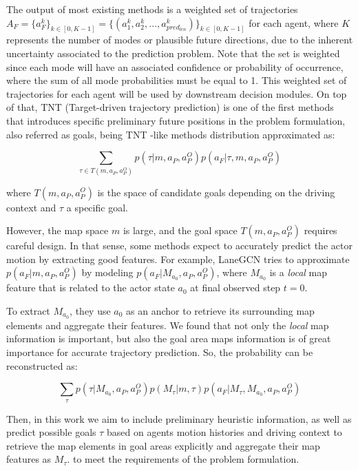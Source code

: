 The output of most existing methods is a weighted set of trajectories $A_F = \{a_{F}^k\}_{k \in [0,K-1]}= \{(a_{1}^k,a_{2}^k,...,a_{pred_{len}}^k)\}_{k \in [0,K-1]}$ for each agent, where $K$ represents the number of modes or plausible future directions, due to the inherent uncertainty associated to the prediction problem. Note that the set is weighted since each mode will have an associated confidence or probability of occurrence, where the sum of all mode probabilities must be equal to 1. This weighted set of trajectories for each agent will be used by downstream decision modules. On top of that, TNT (Target-driven trajectory prediction) \cite{zhao2021tnt} is one of the first methods that introduces specific preliminary future positions in the problem formulation, also referred as goals, being TNT \cite{zhao2021tnt}-like methods distribution approximated as:

\begin{equation}
	\sum_{\tau \in T(m, a_P, a^O_P)}{p(\tau|m, a_P, a^O_P)p(a_F|\tau, m, a_P, a^O_P)}
\end{equation}

where $T(m, a_P, a^O_P)$ is the space of candidate goals depending on the driving context and $\tau$ a specific goal.

However, the map space $m$ is large, and the goal space $T(m, a_P, a^O_P)$ requires careful design. In that sense, some methods expect to accurately predict the actor motion by extracting good features. For example, LaneGCN \cite{liang2020learning} tries to approximate $p(a_F|m, a_P, a^O_P)$ by modeling $p(a_F|M_{a_0}, a_P, a^O_P)$, where $M_{a_0}$ is a \textit{local} map feature that is related to the actor state $a_0$ at final observed step $t=0$.

To extract $M_{a_0}$, they use $a_0$ as an anchor to retrieve its surrounding map elements and aggregate their features. We found that not only the \textit{local} map information is important, but also the goal area maps information is of great importance for accurate trajectory prediction. So, the probability can be reconstructed as:

\begin{equation}
	\sum _{\tau}{p(\tau|M_{a_0}, a_P, a^O_P) p(M_{\tau}|m, \tau)p(a_F|M_{\tau},M_{a_0}, a_P, a^O_P)}
\end{equation}

Then, in this work we aim to include preliminary heuristic information, as well as predict possible goals $\tau$ based on agents motion histories and driving context to retrieve the map elements in goal areas explicitly and aggregate their map features as $M_{\tau}$. to meet the requirements of the problem formulation. 

